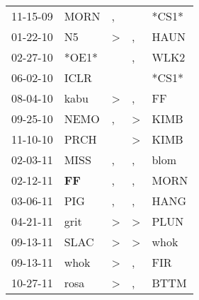 \begin{supertabular}{p{0.07\textwidth}p{0.06\textwidth}p{0.02\textwidth}p{0.02\textwidth}p{0.06\textwidth}}
          11-15-09\textsuperscript{} &           MORN\textsuperscript{} &                , &                  &                            *CS1* \\
          01-22-10\textsuperscript{} &             N5\textsuperscript{} &     \textgreater &                , &           HAUN\textsuperscript{} \\
          02-27-10\textsuperscript{} &                            *OE1* &                  &                , &           WLK2\textsuperscript{} \\
          06-02-10\textsuperscript{} &           ICLR\textsuperscript{} &                  &                  &                            *CS1* \\
          08-04-10\textsuperscript{} &           kabu\textsuperscript{} &     \textgreater &                , &             FF\textsuperscript{} \\
          09-25-10\textsuperscript{} &           NEMO\textsuperscript{} &                , &     \textgreater &           KIMB\textsuperscript{} \\
          11-10-10\textsuperscript{} &           PRCH\textsuperscript{} &                  &     \textgreater &           KIMB\textsuperscript{} \\
          02-03-11\textsuperscript{} &           MISS\textsuperscript{} &                , &                , &           blom\textsuperscript{} \\
          02-12-11\textsuperscript{} &    \textbf{FF\textsuperscript{}} &                , &                , &           MORN\textsuperscript{} \\
          03-06-11\textsuperscript{} &            PIG\textsuperscript{} &                , &                , &           HANG\textsuperscript{} \\
          04-21-11\textsuperscript{} &           grit\textsuperscript{} &     \textgreater &     \textgreater &           PLUN\textsuperscript{} \\
          09-13-11\textsuperscript{} &           SLAC\textsuperscript{} &     \textgreater &     \textgreater &           whok\textsuperscript{} \\
          09-13-11\textsuperscript{} &           whok\textsuperscript{} &     \textgreater &                , &            FIR\textsuperscript{} \\
          10-27-11\textsuperscript{} &           rosa\textsuperscript{} &     \textgreater &                , &           BTTM\textsuperscript{} \\

\end{supertabular}
